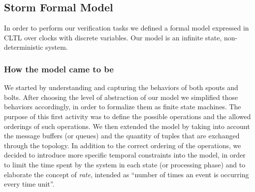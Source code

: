 %


\subsection{Storm Formal Model}
In order to perform our verification tasks we defined a formal model expressed in CLTL over clocks with discrete variables.
Our model is an infinite state, non-deterministic system.

\subsubsection{How the model came to be}
We started by understanding and capturing the behaviors of both spouts and bolts. 
After choosing the level of abstraction of our model we simplified those behaviors accordingly, in order to formalize them as finite state machines. The purpose of this first activity was to define the possible operations and the allowed orderings of such operations.
We then extended the model by taking into account the message buffers (or queues) and the quantity of tuples that are exchanged through the topology.
In addition to the correct ordering of the operations, we decided to introduce more specific temporal constraints into the model, in order to limit the time spent by the system in each state (or processing phase) and to elaborate the concept of \textit{rate}, intended as ``number of times an event is occurring every time unit''.\\


